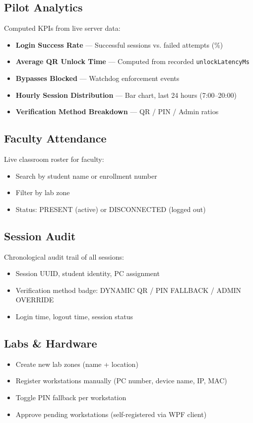 \subsection{Pilot Analytics}
Computed KPIs from live server data:
\begin{itemize}[label={\textcolor{aurxongreen}{\faChartBar}}]
  \item \textbf{Login Success Rate} — Successful sessions vs. failed attempts (\%)
  \item \textbf{Average QR Unlock Time} — Computed from recorded \texttt{unlockLatencyMs}
  \item \textbf{Bypasses Blocked} — Watchdog enforcement events
  \item \textbf{Hourly Session Distribution} — Bar chart, last 24 hours (7:00–20:00)
  \item \textbf{Verification Method Breakdown} — QR / PIN / Admin ratios
\end{itemize}

\subsection{Faculty Attendance}
Live classroom roster for faculty:
\begin{itemize}[label={\textcolor{aurxonblue}{\faUserCheck}}]
  \item Search by student name or enrollment number
  \item Filter by lab zone
  \item Status: PRESENT (active) or DISCONNECTED (logged out)
\end{itemize}

\subsection{Session Audit}
Chronological audit trail of all sessions:
\begin{itemize}[label={\textcolor{aurxongray}{\faHistory}}]
  \item Session UUID, student identity, PC assignment
  \item Verification method badge: \textcolor{aurxonblue}{DYNAMIC QR} / \textcolor{aurxonamber}{PIN FALLBACK} / \textcolor{aurxonred}{ADMIN OVERRIDE}
  \item Login time, logout time, session status
\end{itemize}

\subsection{Labs \& Hardware}
\begin{itemize}[label={\textcolor{aurxonamber}{\faCog}}]
  \item Create new lab zones (name + location)
  \item Register workstations manually (PC number, device name, IP, MAC)
  \item Toggle PIN fallback per workstation
  \item Approve pending workstations (self-registered via WPF client)
\end{itemize}

